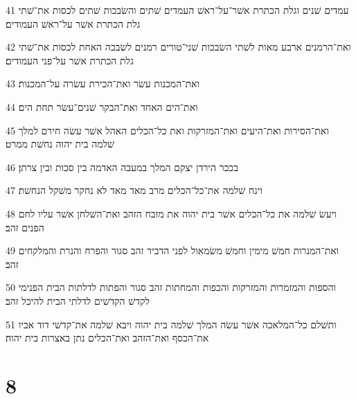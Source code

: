 \par 41 עמדים שׁנים וגלת הכתרת אשׁר־על־ראשׁ העמדים שׁתים והשׂבכות שׁתים לכסות את־שׁתי גלת הכתרת אשׁר על־ראשׁ העמודים׃
\par 42 ואת־הרמנים ארבע מאות לשׁתי השׂבכות שׁני־טורים רמנים לשׂבכה האחת לכסות את־שׁתי גלת הכתרת אשׁר על־פני העמודים׃
\par 43 ואת־המכנות עשׂר ואת־הכירת עשׂרה על־המכנות׃
\par 44 ואת־הים האחד ואת־הבקר שׁנים־עשׂר תחת הים׃
\par 45 ואת־הסירות ואת־היעים ואת־המזרקות ואת כל־הכלים האהל אשׁר עשׂה חירם למלך שׁלמה בית יהוה נחשׁת ממרט׃
\par 46 בככר הירדן יצקם המלך במעבה האדמה בין סכות ובין צרתן׃
\par 47 וינח שׁלמה את־כל־הכלים מרב מאד מאד לא נחקר משׁקל הנחשׁת׃
\par 48 ויעשׂ שׁלמה את כל־הכלים אשׁר בית יהוה את מזבח הזהב ואת־השׁלחן אשׁר עליו לחם הפנים זהב׃
\par 49 ואת־המנרות חמשׁ מימין וחמשׁ משׂמאול לפני הדביר זהב סגור והפרח והנרת והמלקחים זהב׃
\par 50 והספות והמזמרות והמזרקות והכפות והמחתות זהב סגור והפתות לדלתות הבית הפנימי לקדשׁ הקדשׁים לדלתי הבית להיכל זהב׃
\par 51 ותשׁלם כל־המלאכה אשׁר עשׂה המלך שׁלמה בית יהוה ויבא שׁלמה את־קדשׁי דוד אביו את־הכסף ואת־הזהב ואת־הכלים נתן באצרות בית יהוה׃

\chapter{8}

